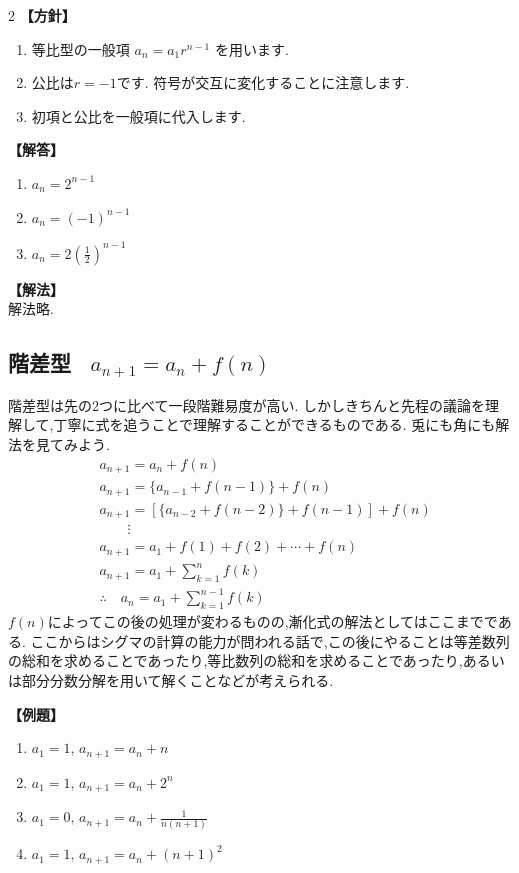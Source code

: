 \documentclass[dvipdfmx,a4paper,11pt,fleqn,openany]{jsbook}
\begin{document}
\begin{multicols*}{2}
      \noindent\textbf{【方針】}
      \begin{enumerate}[label=(\arabic*),parsep=3pt]
        \item 等比型の一般項
              $\displaystyle a_n=a_1r^{n-1}$
              を用います.
        \item 公比は$r=-1$です.
              符号が交互に変化することに注意します.
        \item 初項と公比を一般項に代入します.
      \end{enumerate}

      \noindent\textbf{【解答】}
      \begin{enumerate}[label=(\arabic*),parsep=3pt]
        \item $\displaystyle a_n=2^{n-1}$
        \item $\displaystyle a_n=(-1)^{n-1}$
        \item $\displaystyle a_n=2\left(\frac12\right)^{n-1}$
      \end{enumerate}

      \noindent\textbf{【解法】}\\
      解法略.

    \subsection{階差型 \, $a_{n+1}=a_n+f(n)$}
      階差型は先の2つに比べて一段階難易度が高い.
      しかしきちんと先程の議論を理解して,丁寧に式を追うことで理解することができるものである.
      兎にも角にも解法を見てみよう.
      \begin{align*}
        &a_{n+1}=a_n+f(n)\\
        &a_{n+1}=\{a_{n-1}+f(n-1)\}+f(n)\\
        &a_{n+1}=\left[\{a_{n-2}+f(n-2)\}+f(n-1)\right]+f(n)\\
        &\qquad \vdots\\
        &a_{n+1}=a_1+f(1)+f(2)+\cdots+f(n)\\
        &a_{n+1}=a_1+\sum_{k=1}^{n} f(k)\\
        &\therefore \quad a_n=a_1+\sum_{k=1}^{n-1} f(k)
      \end{align*}
      $f(n)$によってこの後の処理が変わるものの,漸化式の解法としてはここまでである.
      ここからはシグマの計算の能力が問われる話で,この後にやることは等差数列の総和を求めることであったり,等比数列の総和を求めることであったり,あるいは部分分数分解を用いて解くことなどが考えられる.

      \noindent \textbf{【例題】}
      \begin{enumerate}[label=(\arabic*),parsep=3pt]
        \item $\displaystyle a_1=1,\, a_{n+1}=a_n+n$
        \item $\displaystyle a_1=1,\, a_{n+1}=a_n+2^n$
        \item $\displaystyle a_1=0,\, a_{n+1}=a_n+\frac{1}{n(n+1)}$
        \item $\displaystyle a_1=1,\, a_{n+1}=a_n+(n+1)^2$
      \end{enumerate}


\end{multicols*}
\end{document}
